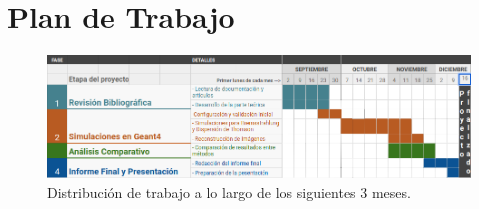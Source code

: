 \vspace*{\fill}

\section{Plan de Trabajo}

\begin{figure}[H]
    \centering
    \includegraphics[scale=0.5]{gantt_excel.png}
    \caption{Distribución de trabajo a lo largo de los siguientes 3 meses.}
    \label{fig:gantt}
\end{figure}


\vspace*{\fill}